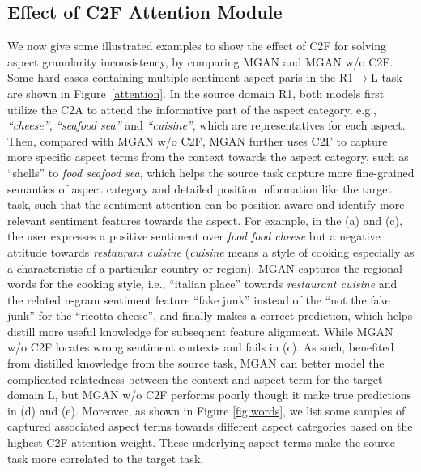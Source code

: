 \documentclass[letterpaper]{article} \usepackage{aaai19}  \usepackage{times}  \usepackage{latexsym}
\begin{document}
\vspace{-1mm}
\subsection{Effect of C2F Attention Module}
\vspace{-0.5mm}
We now give some illustrated examples to show the effect of C2F for solving aspect granularity inconsistency, by comparing MGAN and MGAN w/o C2F. Some hard cases containing multiple sentiment-aspect paris in the R1$\rightarrow$L task are shown in Figure~\ref{attention}. In the source domain R1, both models first utilize the C2A to attend the informative part of the aspect category, e.g., {\it ``cheese''},  {\it ``seafood sea''} and {\it ``cuisine''}, which are representatives for each aspect. Then, compared with MGAN w/o C2F, MGAN further uses C2F to capture more specific aspect terms from the context towards the aspect category, such as {``shells''} to {\it food seafood sea}, which helps the source task capture more fine-grained semantics of aspect category and detailed position information like the target task, such that the sentiment attention can be position-aware and identify more relevant sentiment features towards the aspect. For example, in the (a) and (c), the user expresses a positive sentiment over {\it food food cheese} but a negative attitude towards {\it restaurant cuisine} ({\it cuisine} means a style of cooking especially as a characteristic of a particular country or region). MGAN captures the regional words for the cooking style, i.e., {``italian place''} towards {\it restaurant cuisine} and the related n-gram sentiment feature {``fake junk''} instead of the {``not the fake junk''} for the {``ricotta cheese''}, and finally makes a correct prediction, which helps distill more useful knowledge for subsequent feature alignment. While MGAN w/o C2F locates wrong sentiment contexts and fails in (c). As such, benefited from distilled knowledge from the source task, MGAN can better model the complicated relatedness between the context and aspect term for the target domain L, but MGAN w/o C2F performs poorly though it make true predictions in (d) and (e). Moreover, as shown in Figure \ref{fig:words}, we list some samples of captured associated aspect terms towards different aspect categories based on the highest C2F attention weight. These underlying aspect terms make the source task more correlated to the target task.

\vspace{-2mm}
\end{document}
